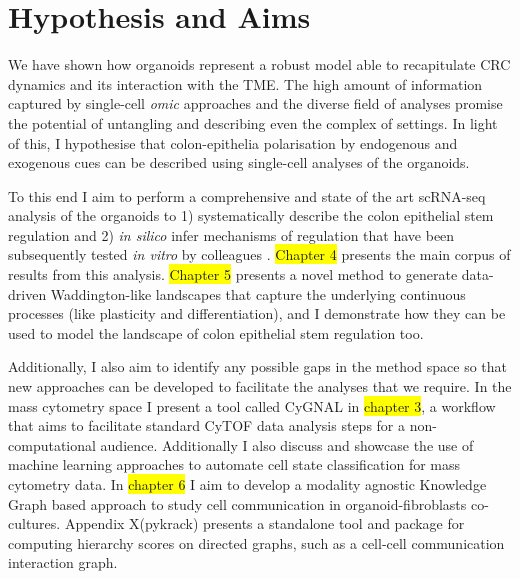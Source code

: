 \section{Hypothesis and Aims}


We have shown how organoids represent a robust model able to recapitulate CRC dynamics and its interaction with the TME. The high amount of information captured by single-cell \emph{omic} approaches and the diverse field of analyses promise the potential of untangling and describing even the complex of settings. 
In light of this, I hypothesise that colon-epithelia polarisation by endogenous and exogenous cues can be described using single-cell analyses of the organoids.

To this end I aim to perform a comprehensive and state of the art scRNA-seq analysis of the organoids to 1) systematically describe the colon epithelial stem regulation and 2) \emph{in silico} infer mechanisms of regulation that have been subsequently tested \emph{in vitro} by colleagues \cite{cardoso_rodriguez_single-cell_2023}. 
\colorbox{yellow}{Chapter 4} presents the main corpus of results from this analysis.
\colorbox{yellow}{Chapter 5} presents a novel method to generate data-driven Waddington-like landscapes that capture the underlying continuous processes (like plasticity and differentiation), and I demonstrate how they can be used to model the landscape of colon epithelial stem regulation too.

Additionally, I also aim to identify any possible gaps in the method space so that new approaches can be developed to facilitate the analyses that we require. In the mass cytometry space I present a tool called CyGNAL in \colorbox{yellow}{chapter 3}, a workflow that aims to facilitate standard CyTOF data analysis steps for a non-computational audience. Additionally I also discuss and showcase the use of machine learning approaches to automate cell state classification for mass cytometry data. 
In \colorbox{yellow}{chapter 6} I aim to develop a modality agnostic Knowledge Graph based approach to study cell communication in organoid-fibroblasts co-cultures. Appendix X(pykrack) presents a standalone tool and package for computing hierarchy scores on directed graphs, such as a cell-cell communication interaction graph.




